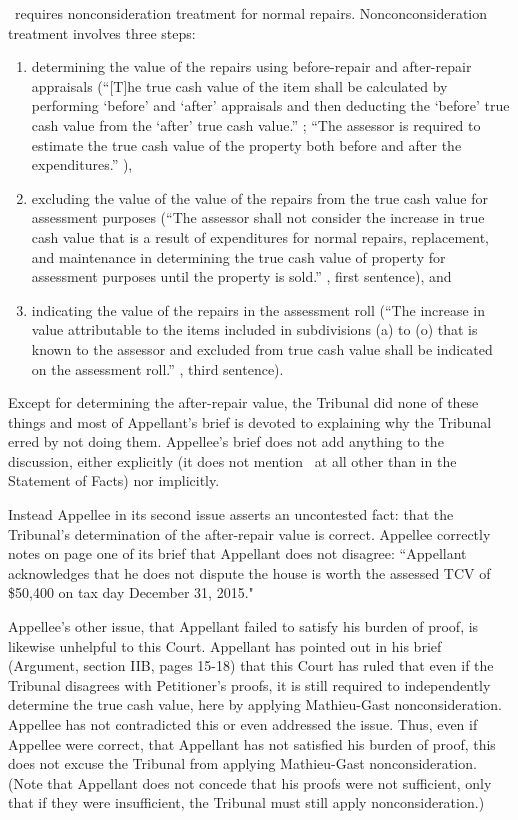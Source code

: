 \documentclass[12pt,\documentclassflag]{michiganCourtOfAppealsBrief}
\begin{document}
\mathieuGast\ requires nonconsideration treatment for normal repairs. Nonconconsideration treatment involves three steps:
\begin{enumerate}
\item determining the value of the repairs using before-repair and after-repair appraisals (``[T]he true cash value of the item shall be calculated by performing `before' and `after' appraisals and then deducting the `before' true cash value from the `after' true cash value.'' ; ``The assessor is required to estimate the true cash value of the property both before and after the expenditures.'' \stcform[2]),

\item excluding the value of the value of the repairs from the true cash value for assessment purposes (``The assessor shall not consider the increase in true cash value that is a result of expenditures for normal repairs, replacement, and maintenance in determining the true cash value of property for assessment purposes until the property is sold.'' \mathieuGast, first sentence), and

\item indicating the value of the repairs in the assessment roll (``The increase in value attributable to the items included in subdivisions (a) to (o) that is known to the assessor and excluded from true cash value shall be indicated on the assessment roll.'' \mathieuGast, third sentence).
\end{enumerate}

Except for determining the after-repair value, the Tribunal did none of these things and most of Appellant's brief is devoted to explaining why the Tribunal erred by not doing them. Appellee's brief does not add anything to the discussion, either explicitly (it does not mention \mathieuGast\ at all other than in the Statement of Facts) nor implicitly.

Instead Appellee in its second issue asserts an uncontested fact: that the Tribunal's determination of the after-repair value is correct. Appellee correctly notes on page one of its brief that Appellant does not disagree: ``Appellant acknowledges that he does not dispute the house is worth the assessed TCV of \$50,400 on tax day December 31, 2015."

Appellee's other issue, that Appellant failed to satisfy his burden of proof, is likewise unhelpful to this Court. Appellant has pointed out in his brief (Argument, section IIB, pages 15-18) that this Court has ruled that even if the Tribunal disagrees with Petitioner's proofs, it is still required to independently determine the true cash value, here by applying Mathieu-Gast nonconsideration. Appellee has not contradicted this or even addressed the issue. Thus, even if Appellee were correct, that Appellant has not satisfied his burden of proof, this does not excuse the Tribunal from applying Mathieu-Gast nonconsideration. (Note that Appellant does not concede that his proofs were not sufficient, only that if they were insufficient, the Tribunal must still apply nonconsideration.)
\end{document}
